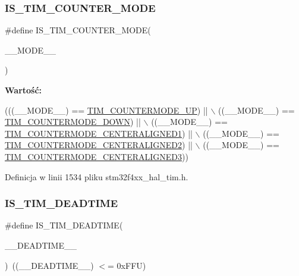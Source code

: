 \subsubsection{\texorpdfstring{I\+S\+\_\+\+T\+I\+M\+\_\+\+C\+O\+U\+N\+T\+E\+R\+\_\+\+M\+O\+DE}{IS\_TIM\_COUNTER\_MODE}}
{\footnotesize\ttfamily \#define I\+S\+\_\+\+T\+I\+M\+\_\+\+C\+O\+U\+N\+T\+E\+R\+\_\+\+M\+O\+DE(\begin{DoxyParamCaption}\item[{}]{\+\_\+\+\_\+\+M\+O\+D\+E\+\_\+\+\_\+ }\end{DoxyParamCaption})}

{\bfseries Wartość\+:}
\begin{DoxyCode}
(((\_\_MODE\_\_) == \hyperlink{group___t_i_m___counter___mode_ga9eb9ab91119c2c76d4db453d599c0b7d}{TIM\_COUNTERMODE\_UP})              || \(\backslash\)
                                            ((\_\_MODE\_\_) == \hyperlink{group___t_i_m___counter___mode_ga5f590fdd7c41df7180b870bb76ff691c}{TIM\_COUNTERMODE\_DOWN})       
           || \(\backslash\)
                                            ((\_\_MODE\_\_) == 
      \hyperlink{group___t_i_m___counter___mode_ga26d8e5236c35d85c2abaa482b5ec6746}{TIM\_COUNTERMODE\_CENTERALIGNED1})  || \(\backslash\)
                                            ((\_\_MODE\_\_) == 
      \hyperlink{group___t_i_m___counter___mode_gae4517c68086ffa61a694576cec8fe634}{TIM\_COUNTERMODE\_CENTERALIGNED2})  || \(\backslash\)
                                            ((\_\_MODE\_\_) == 
      \hyperlink{group___t_i_m___counter___mode_gaf0c3edf6ea1ade3520ab4970e1fc6e92}{TIM\_COUNTERMODE\_CENTERALIGNED3}))
\end{DoxyCode}


Definicja w linii 1534 pliku stm32f4xx\+\_\+hal\+\_\+tim.\+h.

\mbox{\label{group___t_i_m___private___macros_ga223fe03967fab834c92f4159fa2e2817}} 
\subsubsection{\texorpdfstring{I\+S\+\_\+\+T\+I\+M\+\_\+\+D\+E\+A\+D\+T\+I\+ME}{IS\_TIM\_DEADTIME}}
{\footnotesize\ttfamily \#define I\+S\+\_\+\+T\+I\+M\+\_\+\+D\+E\+A\+D\+T\+I\+ME(\begin{DoxyParamCaption}\item[{}]{\+\_\+\+\_\+\+D\+E\+A\+D\+T\+I\+M\+E\+\_\+\+\_\+ }\end{DoxyParamCaption})~((\+\_\+\+\_\+\+D\+E\+A\+D\+T\+I\+M\+E\+\_\+\+\_\+) $<$= 0x\+F\+F\+U)}



